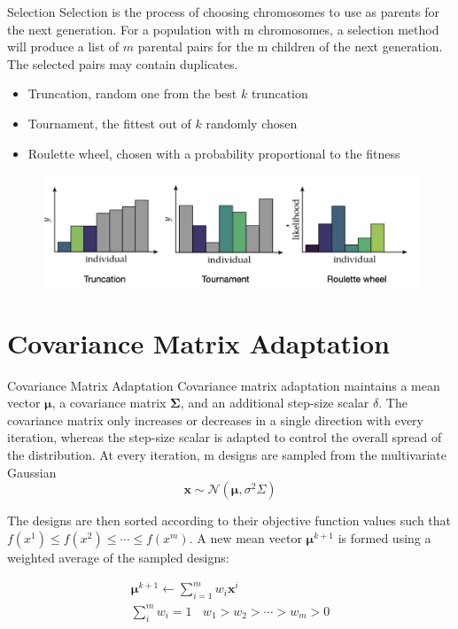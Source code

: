 \documentclass{beamer}
\begin{document}
\begin{frame}{Selection}
Selection is the process of choosing chromosomes to use as parents for the next generation. For a population with m chromosomes, a selection method will produce a list of $m$ parental pairs for the m children of the next generation. The selected pairs may contain duplicates.
\begin{itemize}
    \item Truncation, random one from the best $k$ truncation
    \item Tournament, the fittest out of $k$ randomly chosen
    \item Roulette wheel, chosen with a probability proportional to the fitness
\end{itemize}

\begin{figure}
\centering
\includegraphics[width=120mm]{Figs/selection.jpeg}
\end{figure}   
\end{frame}

\section{Covariance Matrix Adaptation}
\begin{frame}{Covariance Matrix Adaptation}
Covariance matrix adaptation maintains a mean vector $\boldsymbol{\mu}$, a covariance matrix $\boldsymbol{\Sigma}$, and an additional step-size scalar $\delta$. The covariance matrix only increases or decreases in a single direction with every iteration, whereas the step-size scalar is adapted to control the overall spread of the distribution. At every iteration, m designs are sampled from the multivariate Gaussian
\begin{equation*}
    \boldsymbol{x} \sim \mathcal{N} (\boldsymbol{\mu}, \sigma^2 \Sigma)
\end{equation*}

The designs are then sorted according to their objective function values such that $f(x^1) \leq f(x^2) \leq \cdots \leq f(x^m)$. A new mean vector  $\boldsymbol{\mu}^{k+1}$ is formed using a weighted average of the sampled designs:

\begin{gather*}
    \boldsymbol{\mu}^{k+1} \leftarrow \sum_{i=1}^m w_i \boldsymbol{x}^i\\
    \sum_i^m w_i = 1 ~~~~ w_1>w_2>\cdots>w_m>0    
\end{gather*}

\end{frame}
\end{document}
